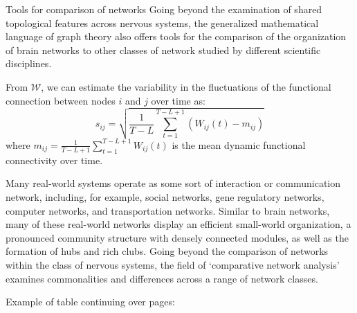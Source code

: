 \documentclass[NETN,manuscript]{stjour-new}
\begin{document}
\begin{boxedtext}{Tools for comparison of networks} 
Going beyond the examination of shared topological features across
nervous systems, the generalized mathematical language of graph theory
also offers tools for the comparison of the organization of brain
networks to other classes of network studied by different scientific
disciplines. 

From $\mathcal{W}$, we can estimate the variability in the fluctuations of the functional connection between nodes $i$ and $j$ over time as:
\begin{equation}
s_{ij}=\sqrt{\frac{1}{T-L}\sum_{t=1}^{T-L+1}(W_{ij}(t) - m_{ij})}
\end{equation}
where $m_{ij}=\frac{1}{T-L+1}\sum_{t=1}^{T-L+1}W_{ij}(t)$ is the mean
dynamic functional connectivity over time. 

Many real-world systems operate as some sort of
interaction or communication network, including, for example, social
networks, gene regulatory networks, computer networks, and
transportation networks. Similar to brain networks, many of these
real-world networks display an efficient small-world organization, a
pronounced community structure with densely connected modules, as well
as the formation of hubs and rich clubs. Going beyond the
comparison of networks within the class of nervous systems, the field
of `comparative network analysis' examines commonalities and
differences across a range of network classes.
\end{boxedtext}

Example of table continuing over pages:
\end{document}
